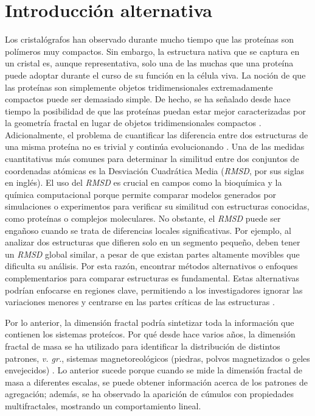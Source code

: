 \chapter{Introducción alternativa}


Los cristal\'{o}grafos han observado durante mucho tiempo que las prote\'{i}nas son pol\'{i}meros muy compactos. Sin embargo, la estructura nativa que se captura en un cristal es, aunque representativa, solo  una de las muchas que una prote\'{i}na puede adoptar durante el curso de su funci\'{o}n en la c\'{e}lula viva. La noci\'{o}n de que las prote\'{i}nas son simplemente objetos tridimensionales extremadamente compactos puede ser demasiado simple. De hecho, se ha señalado desde hace tiempo la posibilidad de que las prote\'{i}nas puedan estar mejor caracterizadas por la geometr\'{i}a fractal en lugar de objetos tridimensionales compactos \cite{ Dewey1997}. Adicionalmente, el problema de cuantificar las diferencia entre dos estructuras de una misma prote\'{i}na no es trivial y contin\'{u}a evolucionando \cite{Kufareva2012}. Una de las medidas  cuantitativas m\'{a}s comunes para 
determinar la similitud entre dos conjuntos de coordenadas at\'{o}micas 
es la Desviaci\'{o}n Cuadr\'{a}tica Media 
(\textit{RMSD}, por sus siglas en ingl\'{e}s). El uso del \textit{RMSD} es crucial en campos como la bioqu\'{i}mica 
y la qu\'{i}mica computacional porque permite comparar modelos generados por 
simulaciones o experimentos para verificar su similitud con estructuras 
conocidas, como prote\'{i}nas o complejos moleculares. 
No obstante, el \textit{RMSD} puede ser engañoso cuando se trata de diferencias
locales significativas. Por ejemplo, al analizar dos estructuras que difieren solo 
en un segmento pequeño, deben tener un \textit{RMSD} global similar, a pesar de que existan partes
altamente movibles que dificulta su an\'{a}lisis. Por esta raz\'{o}n, encontrar
m\'{e}todos alternativos o enfoques complementarios para comparar estructuras 
es fundamental. Estas alternativas podr\'{i}an enfocarse en regiones clave,
permitiendo a los investigadores ignorar las variaciones menores y 
centrarse en las partes cr\'{i}ticas de las estructuras \cite{Kufareva2012}.

Por lo anterior, la dimensi\'{o}n fractal podría sintetizar toda la informaci\'{o}n que contienen los sistemas prote\'{i}cos. Por qué desde hace varios años, la dimensi\'{o}n fractal de masa se ha utilizado para identificar la distribuci\'{o}n de distintos patrones, \textit{v. gr.}, sistemas magnetoreol\'{o}gicos (piedras, polvos magnetizados o geles envejecidos) \cite{Carrillo2003}. Lo anterior sucede porque cuando se mide la dimensi\'{o}n fractal de masa a diferentes escalas, se puede obtener  informaci\'{o}n acerca de los patrones de agregaci\'{o}n; adem\'{a}s, se ha observado la aparici\'{o}n de c\'{u}mulos  con propiedades multifractales, mostrando un comportamiento lineal.

